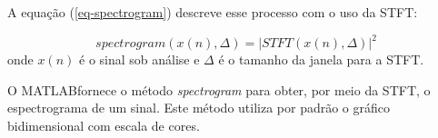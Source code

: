 A equação (\ref{eq-spectrogram}) descreve esse processo com o uso da STFT:

\begin{equation}
	\label{eq-spectrogram}
	spectrogram(x(n), \Delta) = |STFT(x(n),\Delta)|^2
\end{equation}
onde $x(n)$ é o sinal sob análise e $\Delta$ é o tamanho da janela para a STFT.


O MATLAB\rreg fornece o método \textit{spectrogram} para obter, por meio da STFT, o espectrograma de um sinal\cite{mathworks2018spectrogram}. Este método utiliza por padrão o gráfico bidimensional com escala de cores.





